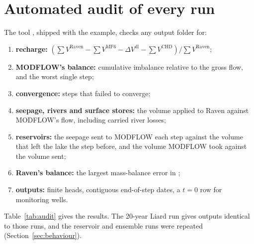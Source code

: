 \section{Automated audit of every run}\label{sec:audit}
The tool , shipped with the example, checks any output folder for:
\begin{enumerate}
\item \textbf{recharge:} $\left(\sum V^{\mathrm{Raven}}-\sum V^{\mathrm{MF6}}-\Delta V^{\mathrm{dl}}-\sum V^{\mathrm{CHD}}\right)/\sum V^{\mathrm{Raven}}$;
\item \textbf{MODFLOW's balance:} cumulative imbalance relative to the gross flow, and the worst single step;
\item \textbf{convergence:} steps that failed to converge;
\item \textbf{seepage, rivers and surface stores:} the volume applied to Raven against MODFLOW's flow, including carried river losses;
\item \textbf{reservoirs:} the seepage sent to MODFLOW each step against the volume that left the lake the step before, and
      the volume MODFLOW took against the volume sent;
\item \textbf{Raven's balance:} the largest mass-balance error in ;
\item \textbf{outputs:} finite heads, contiguous end-of-step dates, a $t=0$ row for monitoring wells.
\end{enumerate}
Table~\ref{tab:audit} gives the results. The 20-year Liard run gives outputs identical to those runs, and the reservoir and ensemble runs were repeated
(Section~\ref{sec:behaviour}).



